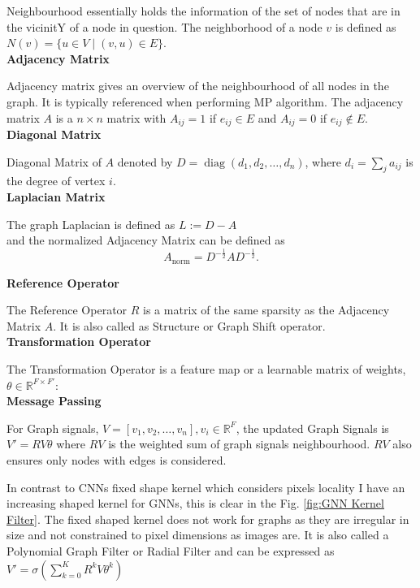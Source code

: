 \documentclass{report} %
\begin{document}
Neighbourhood essentially holds the information of the set of nodes that are in the vicinitY of a node in question.
The neighborhood of a node \( v \) is defined as \( N(v) = \{ u \in V \mid (v, u) \in E \} \).\\

\textbf{Adjacency Matrix}

Adjacency matrix gives an overview of the neighbourhood of all nodes in the graph. It is typically referenced when performing \ac{MP} algorithm.
The adjacency matrix \( A \) is a \( n \times n \) matrix with \( A_{ij} = 1 \) if \( e_{ij} \in E \) and \( A_{ij} = 0 \) if \( e_{ij} \notin E \).\\

\textbf{Diagonal Matrix} 

Diagonal Matrix of \( A \) denoted by  \( D = \operatorname{diag}(d_1, d_2, \dots, d_n) \), where \( d_i = \sum_{j} a_{ij} \) is the degree of vertex \( i \).\\

\textbf{Laplacian Matrix}

The graph Laplacian is defined as \( L := D - A \) \\ and the normalized Adjacency Matrix can be defined as
\[
A_{\text{norm}} = D^{-\frac{1}{2}} A D^{-\frac{1}{2}}.
\]

\textbf{Reference Operator}

The Reference Operator \( R \) is a matrix of the same sparsity as the Adjacency Matrix \( A \). It is also called as Structure or Graph Shift operator.\\

\textbf{Transformation Operator}

The Transformation Operator is a feature map or a learnable matrix of weights, \( \theta \in \mathbb{R}^{F \times F'} \):\\

\textbf{Message Passing}

For Graph signals, \( V = [v_1, v_2, \dots, v_n], v_i  \in \mathbb{R}^F \), the updated Graph Signals is \( V' = RV\theta \) 
where \( RV \) is the weighted sum of graph signals neighbourhood. \( RV \) also ensures only nodes with edges is considered.

In contrast to \ac{CNN}s fixed shape kernel which considers pixels locality I have an increasing shaped kernel for \ac{GNN}s, this is clear in the Fig. \ref{fig:GNN Kernel Filter}. 
The fixed shaped kernel does not work for graphs  as they are irregular in size and not constrained to pixel dimensions as images are. 
It is also called a Polynomial Graph Filter or Radial Filter and can be expressed as $V' = \sigma (\sum_{k=0}^{K}R^{k}V\theta^{k})$ 
\end{document}
